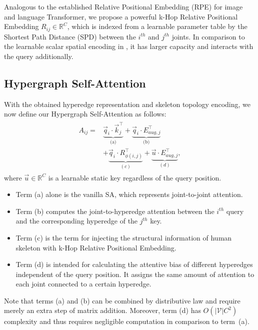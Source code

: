 \documentclass[10pt,twocolumn,letterpaper]{article}
\begin{document}
Analogous to the established Relative Positional Embedding (RPE) for image \cite{wu2021rethinking} and language \cite{he2020deberta, shaw2018self} Transformer, we propose a powerful k-Hop Relative Positional Embedding $R_{ij} \in \mathbb{R}^C$, which is indexed from a learnable parameter table by the Shortest Path Distance (SPD) between the $i^{th}$ and $j^{th}$ joints. 
In comparison to the learnable scalar spatial encoding in \cite{ying2021transformers}, it has larger capacity and interacts with the query additionally.



\subsection{Hypergraph Self-Attention}
With the obtained hyperedge representation and skeleton topology encoding, we now define our Hypergraph Self-Attention as follows:
\begin{align}
\label{eq:6}
\begin{split}
     A_{ij} = & \underbrace{\vec{q}_i \cdot \vec{k}_j^\top}_{\text{(a)}} + \underbrace{\vec{q}_i \cdot E_{aug, j}^\top}_{\text{(b)}} \\
     & + \underbrace{\vec{q}_i \cdot R_{\phi(i, j)}^\top}_{(c)} + \underbrace{\vec{u} \cdot E_{aug, j}^\top}_{(d)},
    \end{split}
\end{align}
where $\vec{u} \in \mathbb{R}^{C} $ is a learnable static key regardless of the query position. 
\begin{itemize}
    \item Term (a) alone is the vanilla SA, which represents joint-to-joint attention.
    \item Term (b) computes the joint-to-hyperedge attention between the $i^{th}$ query and the corresponding hyperedge of the $j^{th}$ key.
    \item Term (c) is the term for injecting the structural information of human skeleton with k-Hop Relative Positional Embedding. 
    \item Term (d) is intended for calculating the attentive bias of different hyperedges independent of the query position. It assigns the same amount of attention to each joint connected to a certain hyperedge.
\end{itemize}

Note that terms (a) and (b) can be combined by distributive law and require merely an extra step of matrix addition. Moreover, term (d) has $O(\vert \mathcal{V} \vert C^2)$ complexity and thus requires negligible computation in comparison to term~(a).
\end{document}
